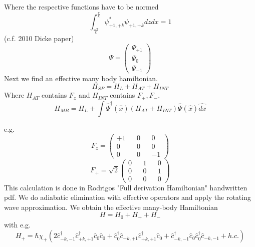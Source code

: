 Where the respective functions have to be normed
\begin{equation}
	\int_{\frac{-\pi}{k}}^{\frac{\pi}{k}}  \psi^*_{+1,+k} \psi_{+1,+k} dz dx = 1
\end{equation}(c.f. 2010 Dicke paper)
\begin{equation}
	\Psi = \left( \begin{matrix}
		\Psi_{+1}
		\\
		\Psi_0
		\\
		\Psi_{-1}
	\end{matrix}\right)
\end{equation}
Next we find an effective many body hamiltonian.
\begin{equation}
	H_{SP} = H_L + H_{AT} + H_{INT}
\end{equation}
Where $H_{AT}$ contains $F_z$ and $H_{INT}$ contains $F_+, F_-$.
\begin{equation}
	H_{MB} = H_L + \int \hat{\Psi}^\dag(\hat{x}) ( H_{AT} + H_{INT}) \hat{\Psi}(\hat{x}) \hat{dx}
\end{equation}

e.g. 
\begin{equation}
	F_z = \left( 
	\begin{matrix}
		+1 && 0 && 0
		\\
		0 && 0 && 0 
		\\ 
		0 && 0 && -1
	\end{matrix}
	\right) 
\end{equation}
\begin{equation}
	F_+ =\sqrt{2} \left( 
	\begin{matrix}
		0 && 1 && 0
		\\
		0 && 0 && 1 
		\\ 
		0 && 0 && 0
	\end{matrix}
	\right) 
\end{equation}
This calculation is done in Rodrigos "Full derivation Hamiltonian" handwritten pdf. We do adiabatic elimination with effective operators and apply the rotating wave approximation. 
We obtain the effective many-body Hamiltonian
\begin{equation}\label{eq:fou_effective_many_body_hamiltonian}
	H = H_0 + H_+ + H_-
\end{equation}
with e.g.
\begin{equation}
	H_+ = \hbar \chi_+ (2 \hat{c}^\dag_{-k,-1} \hat{c}^\dag_{+k,+1}\hat{c}_0 \hat{c}_0+ \hat{c}^\dag_0 \hat{c}_{+k,+1}\hat{c}^\dag_{+k,+1}\hat{c}_0 + \hat{c}^\dag_{-k,-1}\hat{c}_0\hat{c}_0^\dag \hat{c}_{-k,-1} + h.c.)
\end{equation}
